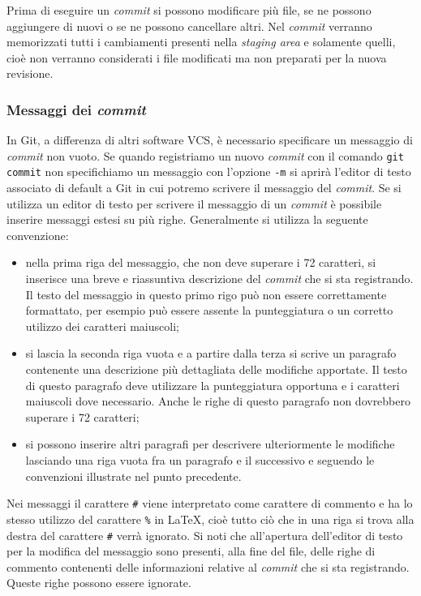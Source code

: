 \documentclass[a4paper,12pt,oneside]{article}
\begin{document}
Prima di eseguire un \emph{commit} si possono modificare più file, se ne possono
aggiungere di nuovi o se ne possono cancellare altri. Nel \emph{commit} verranno
memorizzati tutti i cambiamenti presenti nella \emph{staging area} e solamente
quelli, cioè non verranno considerati i file modificati ma non preparati per la
nuova revisione.

\subsubsection{Messaggi dei \emph{commit}}
\label{sec:messaggi-commit}

In Git, a differenza di altri software VCS, è necessario specificare un
messaggio di \emph{commit} non vuoto. Se quando registriamo un nuovo
\emph{commit} con il comando \lstinline|git commit| non specifichiamo un
messaggio con l'opzione \lstinline|-m| si aprirà l'editor di testo associato di
default a Git in cui potremo scrivere il messaggio del \emph{commit}. Se si
utilizza un editor di testo per scrivere il messaggio di un \emph{commit} è
possibile inserire messaggi estesi su più righe. Generalmente si utilizza la
seguente convenzione:
\begin{itemize}
\item nella prima riga del messaggio, che non deve superare i 72 caratteri, si
  inserisce una breve e riassuntiva descrizione del \emph{commit} che si sta
  registrando. Il testo del messaggio in questo primo rigo può non essere
  correttamente formattato, per esempio può essere assente la punteggiatura o un
  corretto utilizzo dei caratteri maiuscoli;
\item si lascia la seconda riga vuota e a partire dalla terza si scrive un
  paragrafo contenente una descrizione più dettagliata delle modifiche
  apportate. Il testo di questo paragrafo deve utilizzare la punteggiatura
  opportuna e i caratteri maiuscoli dove necessario. Anche le righe di questo
  paragrafo non dovrebbero superare i 72 caratteri;
\item si possono inserire altri paragrafi per descrivere ulteriormente le
  modifiche lasciando una riga vuota fra un paragrafo e il successivo e seguendo
  le convenzioni illustrate nel punto precedente.
\end{itemize}

Nei messaggi il carattere \lstinline|#| viene interpretato come carattere di
commento e ha lo stesso utilizzo del carattere \lstinline|%| in \LaTeX, cioè
tutto ciò che in una riga si trova alla destra del carattere \lstinline|#| verrà
ignorato. Si noti che all'apertura dell'editor di testo per la modifica del
messaggio sono presenti, alla fine del file, delle righe di commento contenenti
delle informazioni relative al \emph{commit} che si sta registrando. Queste
righe possono essere ignorate.
\end{document}
